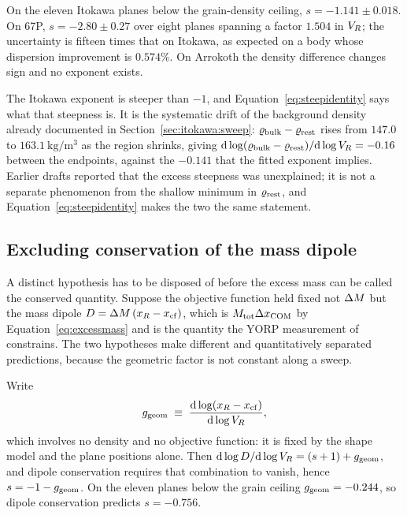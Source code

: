 On the eleven Itokawa planes below the grain-density ceiling, $s = -1.141 \pm 0.018$. On 67P,
$s = -2.80 \pm 0.27$ over eight planes spanning a factor $1.504$ in $V_{R}$;
the uncertainty is fifteen times that on Itokawa, as expected on a body whose
dispersion improvement is $0.574\%$. On Arrokoth the density difference
changes sign and no exponent exists.

The Itokawa exponent is steeper than $-1$, and
Equation~\eqref{eq:steepidentity} says what that steepness is. It is the
systematic drift of the background density already documented in
Section~\ref{sec:itokawa:sweep}: $\varrho_{\mathrm{bulk}} - \varrho_{\mathrm{rest}}$ rises from $147.0$
to $\SI{163.1}{\kilo\gram\per\cubic\metre}$ as the region shrinks, giving
$\mathrm{d}\log(\varrho_{\mathrm{bulk}}-\varrho_{\mathrm{rest}})/\mathrm{d}\log V_{R} = -0.16$ between the
endpoints, against the $-0.141$ that the fitted exponent implies. Earlier
drafts reported that the excess steepness was unexplained; it is not a
separate phenomenon from the shallow minimum in $\varrho_{\mathrm{rest}}$, and
Equation~\eqref{eq:steepidentity} makes the two the same statement.

\subsection{Excluding conservation of the mass dipole}
\label{sec:constrains:dipole}

A distinct hypothesis has to be disposed of before the excess mass can be
called the conserved quantity. Suppose the objective function held fixed not
$\Delta M$ but the mass dipole
$D = \Delta M\,(x_R - x_{\mathrm{cf}})$, which is $M_{\mathrm{tot}}\Delta x_{\mathrm{COM}}$ by
Equation~\eqref{eq:excessmass} and is the quantity the YORP measurement of
\citet{lowry2014} constrains. The two hypotheses make different and
quantitatively separated predictions, because the geometric factor is not
constant along a sweep.

Write
%
\begin{equation}
g_{\mathrm{geom}} \;\equiv\;
 \frac{\mathrm{d}\log\!\left(x_R - x_{\mathrm{cf}}\right)}{\mathrm{d}\log V_{R}} ,
\label{eq:geomslope}
\end{equation}
%
which involves no density and no objective function: it is fixed by the
shape model and the plane positions alone. Then
$\mathrm{d}\log D/\mathrm{d}\log V_{R} = (s+1) + g_{\mathrm{geom}}$, and dipole
conservation requires that combination to vanish, hence
$s = -1 - g_{\mathrm{geom}}$. On the eleven planes below the grain ceiling
$g_{\mathrm{geom}} = -0.244$, so dipole conservation predicts $s = -0.756$.

